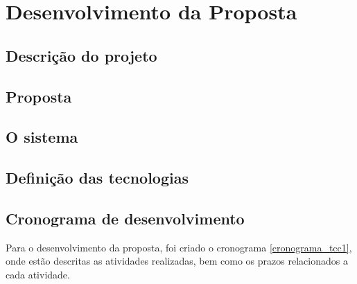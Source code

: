 

\chapter[Desenvolvimento da Proposta]{Desenvolvimento da Proposta}




\section{Descrição do projeto}


\section{Proposta}



\section{O sistema}

\section{Definição das tecnologias}

\section{Cronograma de desenvolvimento}

Para o desenvolvimento da proposta, foi criado o cronograma \ref{cronograma_tcc1}, onde estão descritas as atividades realizadas, bem como os prazos relacionados a cada atividade.

